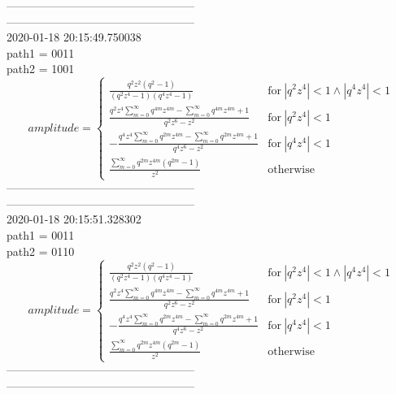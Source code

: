 --------------------------------------------------\\
--------------------------------------------------\\
2020-01-18 20:15:49.750038\\
path1 = 0011\\
path2 = 1001\\
$$amplitude = \begin{cases} \frac{q^{2} z^{2} \left(q^{2} - 1\right)}{\left(q^{2} z^{4} - 1\right) \left(q^{4} z^{4} - 1\right)} & \text{for}\: \left|{q^{2} z^{4}}\right| < 1 \wedge \left|{q^{4} z^{4}}\right| < 1 \\\frac{q^{2} z^{4} \sum_{m=0}^{\infty} q^{4 m} z^{4 m} - \sum_{m=0}^{\infty} q^{4 m} z^{4 m} + 1}{q^{2} z^{6} - z^{2}} & \text{for}\: \left|{q^{2} z^{4}}\right| < 1 \\- \frac{q^{4} z^{4} \sum_{m=0}^{\infty} q^{2 m} z^{4 m} - \sum_{m=0}^{\infty} q^{2 m} z^{4 m} + 1}{q^{4} z^{6} - z^{2}} & \text{for}\: \left|{q^{4} z^{4}}\right| < 1 \\\frac{\sum_{m=0}^{\infty} q^{2 m} z^{4 m} \left(q^{2 m} - 1\right)}{z^{2}} & \text{otherwise} \end{cases}$$
--------------------------------------------------\\
--------------------------------------------------\\
2020-01-18 20:15:51.328302\\
path1 = 0011\\
path2 = 0110\\
$$amplitude = \begin{cases} \frac{q^{2} z^{2} \left(q^{2} - 1\right)}{\left(q^{2} z^{4} - 1\right) \left(q^{4} z^{4} - 1\right)} & \text{for}\: \left|{q^{2} z^{4}}\right| < 1 \wedge \left|{q^{4} z^{4}}\right| < 1 \\\frac{q^{2} z^{4} \sum_{m=0}^{\infty} q^{4 m} z^{4 m} - \sum_{m=0}^{\infty} q^{4 m} z^{4 m} + 1}{q^{2} z^{6} - z^{2}} & \text{for}\: \left|{q^{2} z^{4}}\right| < 1 \\- \frac{q^{4} z^{4} \sum_{m=0}^{\infty} q^{2 m} z^{4 m} - \sum_{m=0}^{\infty} q^{2 m} z^{4 m} + 1}{q^{4} z^{6} - z^{2}} & \text{for}\: \left|{q^{4} z^{4}}\right| < 1 \\\frac{\sum_{m=0}^{\infty} q^{2 m} z^{4 m} \left(q^{2 m} - 1\right)}{z^{2}} & \text{otherwise} \end{cases}$$
--------------------------------------------------\\
--------------------------------------------------\\
